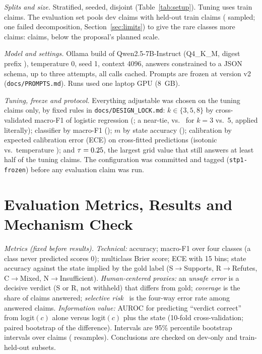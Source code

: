 \documentclass[acmlarge]{acmart}
\newcommand{\runin}[1]{\par\addvspace{4pt}\noindent\hspace{\parindent}\textit{#1}\hspace{0.45em}\ignorespaces}
\begin{document}
\runin{Splits and size.} Stratified, seeded, disjoint (Table~\ref{tab:setup}). Tuning uses \nTune{} train claims. The evaluation set pools \nDev{} dev claims with \nTrain{} held-out train claims (\nTrainSampled{} sampled; one failed decomposition, Section~\ref{sec:limits}) to give the rare classes more claims: \nPool{} claims, below the proposal's planned scale.

\begin{table}[t]
  \centering\small
  \caption{Claims per set and gold label (S Supported, R Refuted, C Conflicting, N Not Enough Evidence), after the exclusion filter.}
  \label{tab:setup}
  
\end{table}

\runin{Model and settings.} Ollama build of Qwen2.5-7B-Instruct (Q4\_K\_M, digest prefix \modelDigest{}), temperature 0, seed 1, context 4096, answers constrained to a JSON schema, up to three attempts, all calls cached. Prompts are frozen at version v2 (\texttt{docs/PROMPTS.md}). Runs used one laptop GPU (8~GB).

\runin{Tuning, freeze and protocol.} Everything adjustable was chosen on the tuning claims only, by fixed rules in \texttt{docs/DESIGN\_LOCK.md}: $k\in\{3,5,8\}$ by cross-validated macro-F1 of logistic regression (\chosenK; a near-tie, \tuneFoneLRthree{} vs.\ \tuneFoneLRfive{} for $k=3$ vs.\ 5, applied literally); classifier by macro-F1 (\chosenClf); $m$ by state accuracy (\chosenM); calibration by expected calibration error (ECE) on cross-fitted predictions (isotonic \tuneECEiso{} vs.\ temperature \tuneECEtemp{}); and $\tau=0.25$, the largest grid value that still answers at least half of the tuning claims. The configuration was committed and tagged (\texttt{stp1-frozen}) before any evaluation claim was run.

\section{Evaluation Metrics, Results and Mechanism Check}\label{sec:eval}
\runin{Metrics (fixed before results).} \emph{Technical:} accuracy; macro-F1 over four classes (a class never predicted scores 0); multiclass Brier score; ECE with 15 bins; state accuracy against the state implied by the gold label (S$\to$Supports, R$\to$Refutes, C$\to$Mixed, N$\to$Insufficient). \emph{Human-centered proxies:} an \emph{unsafe error} is a decisive verdict (S or R, not withheld) that differs from gold; \emph{coverage} is the share of claims answered; \emph{selective risk}~\cite{geifman2017} is the four-way error rate among answered claims. \emph{Information value:} AUROC for predicting ``verdict correct'' from logit$(c)$ alone versus logit$(c)$ plus the state (10-fold cross-validation; paired bootstrap of the difference). Intervals are 95\% percentile bootstrap intervals over claims (\bootN{} resamples). Conclusions are checked on dev-only and train-held-out subsets.
\end{document}
